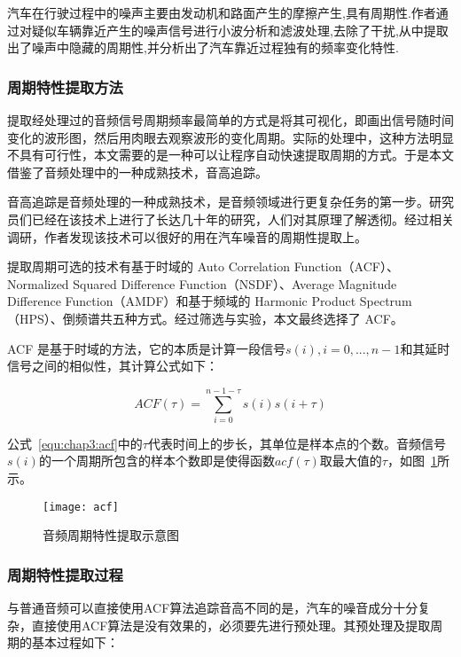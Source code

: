 汽车在行驶过程中的噪声主要由发动机和路面产生的摩擦产生,具有周期性.作者通过对疑似车辆靠近产生的噪声信号进行小波分析和滤波处理,去除了干扰,从中提取出了噪声中隐藏的周期性,并分析出了汽车靠近过程独有的频率变化特性.

\subsubsection{周期特性提取方法}

提取经处理过的音频信号周期频率最简单的方式是将其可视化，即画出信号随时间变化的波形图，然后用肉眼去观察波形的变化周期。实际的处理中，这种方法明显不具有可行性，本文需要的是一种可以让程序自动快速提取周期的方式。于是本文借鉴了音频处理中的一种成熟技术，音高追踪。

音高追踪是音频处理的一种成熟技术，是音频领域进行更复杂任务的第一步。研究员们已经在该技术上进行了长达几十年的研究，人们对其原理了解透彻。经过相关调研，作者发现该技术可以很好的用在汽车噪音的周期性提取上。

提取周期可选的技术有基于时域的 Auto Correlation Function（ACF）、Normalized Squared Difference Function（NSDF）、Average Magnitude Difference Function（AMDF）和基于频域的 Harmonic Product Spectrum（HPS）、倒频谱共五种方式。经过筛选与实验，本文最终选择了 ACF。

ACF 是基于时域的方法，它的本质是计算一段信号$s(i),i=0,...,n-1$和其延时信号之间的相似性，其计算公式如下：

\begin{equation}
\label{equ:chap3:acf}
ACF\left( \tau  \right) = \sum\limits_{i = 0}^{n - 1 - \tau } {s\left( i \right)s\left( {i + \tau } \right)} 
\end{equation}


公式~\ref{equ:chap3:acf}中的$\tau$代表时间上的步长，其单位是样本点的个数。音频信号$s(i)$的一个周期所包含的样本个数即是使得函数$acf(\tau)$取最大值的$\tau$，如图~\ref{fig:acf}所示。


\begin{figure}[htbp] %
  \centering
  \texttt{[image: acf]}
  \caption{音频周期特性提取示意图}
  \label{fig:acf}
\end{figure}



\subsubsection{周期特性提取过程}

与普通音频可以直接使用ACF算法追踪音高不同的是，汽车的噪音成分十分复杂，直接使用ACF算法是没有效果的，必须要先进行预处理。其预处理及提取周期的基本过程如下：

